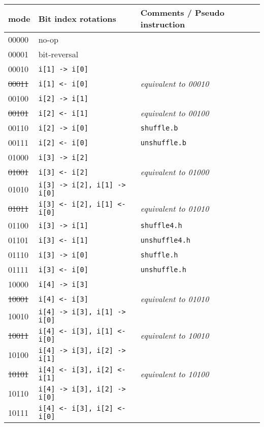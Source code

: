 \begin{table}[h]
\begin{small}
\begin{center}
\begin{tabular}{l l l}
      mode   & Bit index rotations              & Comments / Pseudo instruction \\ \hline

      00000  & no-op                            & \\
      00001  & bit-reversal                     & \\
      00010  & {\tt i[1] -> i[0]}               & \\
\sout{00011} & {\tt i[1] <- i[0]}               & {\it equivalent to 00010} \\
      00100  & {\tt i[2] -> i[1]}               & \\
\sout{00101} & {\tt i[2] <- i[1]}               & {\it equivalent to 00100} \\
      00110  & {\tt i[2] -> i[0]}               & {\tt shuffle.b} \\
      00111  & {\tt i[2] <- i[0]}               & {\tt unshuffle.b} \\

\hline

      01000  & {\tt i[3] -> i[2]}               & \\
\sout{01001} & {\tt i[3] <- i[2]}               & {\it equivalent to 01000} \\
      01010  & {\tt i[3] -> i[2], i[1] -> i[0]} & \\
\sout{01011} & {\tt i[3] <- i[2], i[1] <- i[0]} & {\it equivalent to 01010} \\
      01100  & {\tt i[3] -> i[1]}               & {\tt shuffle4.h} \\
      01101  & {\tt i[3] <- i[1]}               & {\tt unshuffle4.h} \\
      01110  & {\tt i[3] -> i[0]}               & {\tt shuffle.h} \\
      01111  & {\tt i[3] <- i[0]}               & {\tt unshuffle.h} \\

\hline

      10000  & {\tt i[4] -> i[3]}               & \\
\sout{10001} & {\tt i[4] <- i[3]}               & {\it equivalent to 01010} \\
      10010  & {\tt i[4] -> i[3], i[1] -> i[0]} & \\
\sout{10011} & {\tt i[4] <- i[3], i[1] <- i[0]} & {\it equivalent to 10010} \\
      10100  & {\tt i[4] -> i[3], i[2] -> i[1]} & \\
\sout{10101} & {\tt i[4] <- i[3], i[2] <- i[1]} & {\it equivalent to 10100} \\
      10110  & {\tt i[4] -> i[3], i[2] -> i[0]} & \\
      10111  & {\tt i[4] <- i[3], i[2] <- i[0]} & \\


\end{tabular}
\end{center}
\end{small}
\end{table}

